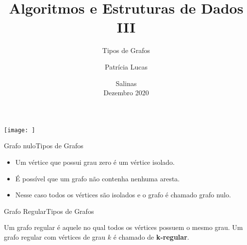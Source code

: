 \documentclass[t]{beamer}
\title[]{Algoritmos e Estruturas de Dados III}
\subtitle[]{Tipos de Grafos}
\author[]{Patrícia Lucas\\{\footnotesize }}
\institute{Bacharelado em Sistemas de Informação \\ IFNMG  - Campus Salinas}
\date{\scriptsize Salinas\\Dezembro 2020}
\begin{document}
\begin{frame}

\begin{center}
\texttt{[image: ]}
\end{center}
  \titlepage
\end{frame}

\begin{ftst}{Grafo nulo}{Tipos de Grafos}

\begin{itemize}
    \item Um vértice que possui grau zero é um vértice isolado.
    \item É possível que um grafo não contenha nenhuma aresta. 
    \item Nesse caso todos os vértices são isolados e o grafo é chamado grafo nulo.
\end{itemize}
\vone
\centering


\end{ftst}


\begin{ftst}{Grafo Regular}{Tipos de Grafos}

Um grafo regular é aquele no qual todos os vértices possuem o mesmo grau. Um grafo regular com vértices de grau $k$ é chamado de \textbf{k-regular}.

\vone

\centering 

\end{ftst}

\end{document}
